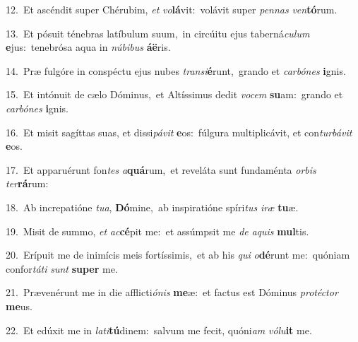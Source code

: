 {\numbfont\textcolor{\numbcolor}{12.}}~Et ascéndit super Chérubim, \textit{et} \textit{vo}\-\textbf{lá}vit:~\star volávit super \textit{pen}\-\textit{nas} \textit{ven}\-\textbf{tó}rum.\par
{\numbfont\textcolor{\numbcolor}{13.}}~Et pósuit ténebras latíbulum suum,~\dagger in circúitu ejus taberná\-\textit{cu}\-\textit{lum} \textbf{e}\-jus:~\star tenebrósa aqua in \textit{nú}\-\textit{bi}\textit{bus} \textbf{á}\-\textbf{ë}ris.\par
{\numbfont\textcolor{\numbcolor}{14.}}~Præ fulgóre in conspéctu ejus nubes \textit{trans}\-\textit{i}\textbf{é}runt,~\star grando et \textit{car}\-\textit{bó}\textit{nes} \textbf{i}\-gnis.\par
{\numbfont\textcolor{\numbcolor}{15.}}~Et intónuit de cælo Dóminus,~\dagger et Altíssimus dedit \textit{vo}\-\textit{cem} \textbf{su}\-am:~\star grando et \textit{car}\-\textit{bó}\textit{nes} \textbf{i}\-gnis.\par
{\numbfont\textcolor{\numbcolor}{16.}}~Et misit sagíttas suas, et dissi\-\textit{pá}\-\textit{vit} \textbf{e}\-os:~\star fúlgura multiplicávit, et con\-\textit{tur}\-\textit{bá}\textit{vit} \textbf{e}\-os.\par
{\numbfont\textcolor{\numbcolor}{17.}}~Et apparuérunt fon\textit{tes} \textit{a}\-\textbf{quá}rum,~\star et reveláta sunt fundaménta \textit{or}\-\textit{bis} \textit{ter}\-\textbf{rá}rum:\par
{\numbfont\textcolor{\numbcolor}{18.}}~Ab increpatióne \textit{tu}\-\textit{a}, \textbf{Dó}\-mine,~\star ab inspiratióne spíri\textit{tus} \textit{i}\-\textit{ræ} \textbf{tu}\-æ.\par
{\numbfont\textcolor{\numbcolor}{19.}}~Misit de summo, \textit{et} \textit{ac}\-\textbf{cé}pit me:~\star et assúmpsit me \textit{de} \textit{a}\-\textit{quis} \textbf{mul}\-tis.\par
{\numbfont\textcolor{\numbcolor}{20.}}~Erípuit me de inimícis meis fortíssimis,~\dagger et ab his \textit{qui} \textit{o}\-\textbf{dé}runt me:~\star quóniam confor\-\textit{tá}\-\textit{ti} \textit{sunt} \textbf{su}\-\textbf{per} me.\par
{\numbfont\textcolor{\numbcolor}{21.}}~Prævenérunt me in die afflicti\-\textit{ó}\-\textit{nis} \textbf{me}\-æ:~\star et factus est Dóminus \textit{pro}\-\textit{téc}\textit{tor} \textbf{me}\-us.\par
{\numbfont\textcolor{\numbcolor}{22.}}~Et edúxit me in \textit{la}\-\textit{ti}\textbf{tú}dinem:~\star salvum me fecit, quóni\textit{am} \textit{vó}\-\textit{lu}\textbf{it} me.\par
